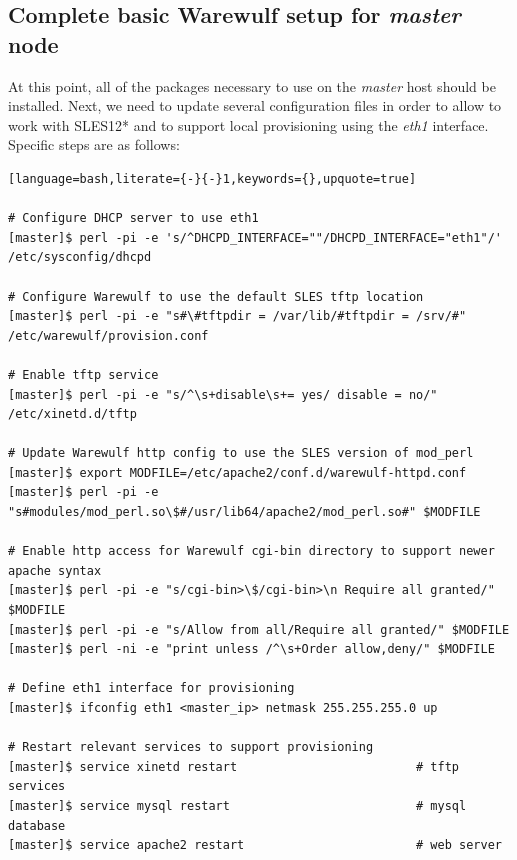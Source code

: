 \documentclass[letterpaper]{article}
\newcommand{\baseOS}{SLES12*}
\begin{document}
\subsection{Complete basic Warewulf setup for {\em master} node}

At this point, all of the packages necessary to use \Warewulf{} on the {\em
  master} host should be installed.  Next, we need to update several
configuration files in order to allow \Warewulf{} to work with \baseOS{} and to support
local provisioning using the {\em eth1} interface.  Specific steps are as
follows:


\begin{lstlisting}[language=bash,literate={-}{-}1,keywords={},upquote=true]

# Configure DHCP server to use eth1
[master]$ perl -pi -e 's/^DHCPD_INTERFACE=""/DHCPD_INTERFACE="eth1"/' /etc/sysconfig/dhcpd

# Configure Warewulf to use the default SLES tftp location
[master]$ perl -pi -e "s#\#tftpdir = /var/lib/#tftpdir = /srv/#" /etc/warewulf/provision.conf

# Enable tftp service
[master]$ perl -pi -e "s/^\s+disable\s+= yes/ disable = no/" /etc/xinetd.d/tftp

# Update Warewulf http config to use the SLES version of mod_perl
[master]$ export MODFILE=/etc/apache2/conf.d/warewulf-httpd.conf
[master]$ perl -pi -e "s#modules/mod_perl.so\$#/usr/lib64/apache2/mod_perl.so#" $MODFILE

# Enable http access for Warewulf cgi-bin directory to support newer apache syntax
[master]$ perl -pi -e "s/cgi-bin>\$/cgi-bin>\n Require all granted/" $MODFILE
[master]$ perl -pi -e "s/Allow from all/Require all granted/" $MODFILE
[master]$ perl -ni -e "print unless /^\s+Order allow,deny/" $MODFILE

# Define eth1 interface for provisioning
[master]$ ifconfig eth1 <master_ip> netmask 255.255.255.0 up

# Restart relevant services to support provisioning
[master]$ service xinetd restart                         # tftp services
[master]$ service mysql restart                          # mysql database
[master]$ service apache2 restart                        # web server
\end{lstlisting}
\end{document}
